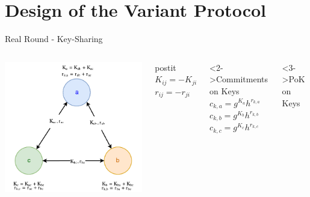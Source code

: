 \section{Design of the Variant Protocol}

\begin{frame}{Real Round - Key-Sharing}
    \begin{columns}[c]
            \hspace{-0.9cm}
            \includegraphics[scale=.6]{images/keys-sharing.pdf}
            \vspace{.2cm}
            \centering
            \begin{beamercolorbox}[sep=.5em,wd=3cm,center]{postit}
                $K_{ij} = -K_{ji}$\\
                $r_{ij} = -r_{ji}$
            \end{beamercolorbox}
            \begin{block}<2->{Commitments on Keys}
                \centering
                $c_{k,a} = g^{K_a} h^{r_{k,a}}$\\
                $c_{k,b} = g^{K_b} h^{r_{k,b}}$\\
                $c_{k,c} = g^{K_c} h^{r_{k,c}}$
            \end{block}
            \begin{block}<3->{PoK on Keys}

\end{block}
\end{columns}
\end{frame}
